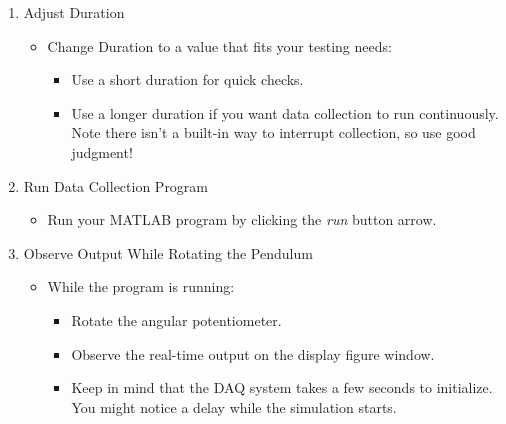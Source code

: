\documentclass{article} %
\begin{document}
\begin{enumerate}
    \item Adjust Duration
    \begin{itemize}
        \item Change Duration to a value that fits your testing needs:
        \begin{itemize}
            \item Use a short duration for quick checks.
            \item Use a longer duration if you want data collection  to run continuously. Note there isn't a built-in way to interrupt collection, so use good judgment! 
        \end{itemize}
    \end{itemize}
    
    \item Run Data Collection Program
    \begin{itemize}
        \item Run your MATLAB program by clicking the \textit{run} button arrow.
    \end{itemize}
    
    \item Observe Output While Rotating the Pendulum
    \begin{itemize}
        \item While the program is running:
        \begin{itemize}
            \item Rotate the angular potentiometer.
            \item Observe the real-time output on the display figure window.
            \item Keep in mind that the DAQ system takes a few seconds to initialize. You might notice a delay while the simulation starts. 
        \end{itemize}
    \end{itemize}
    

\end{enumerate}
\end{document}
